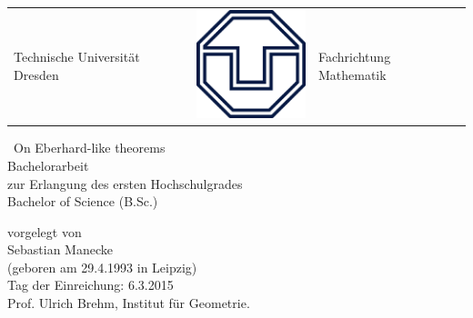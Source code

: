 \thispagestyle{empty}
\begin{center}


  \begin{tabular}{R{6.9cm} M p{6.9cm}}
    {\Large Technische Universität Dresden}&  \includegraphics[scale =0.25]{TU.png} & \Large{Fachrichtung Mathematik}     
  \end{tabular}

  \vfil

  {\Huge\ On Eberhard-like theorems}
  \\[\bigskipamount]
  \vfil
      {\LARGE
        Bachelorarbeit
        \\[\bigskipamount]
        zur Erlangung des ersten Hochschulgrades
        \\[\bigskipamount]
        Bachelor of Science  (B.Sc.)
        \\[\bigskipamount]
      }




      vorgelegt von
      \\[\bigskipamount]
      Sebastian Manecke
      \\[\bigskipamount]
      (geboren am 29.4.1993 in Leipzig)
      \\[\bigskipamount]
      Tag der Einreichung: 6.3.2015
      \\[\bigskipamount]
      Prof. Ulrich Brehm, Institut für Geometrie.
\end{center}
\newpage
